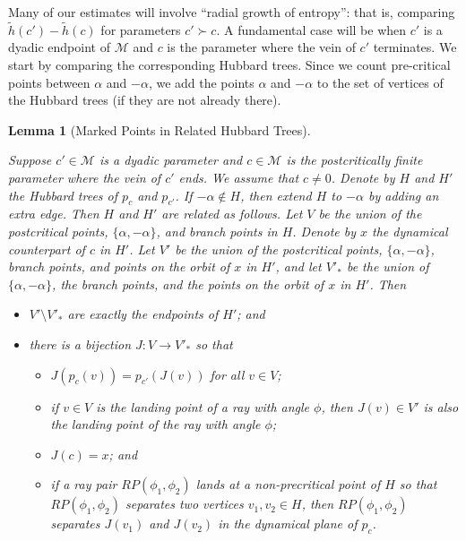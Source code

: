 \documentclass[12pt]{amsart}
\newcommand{\M}{\mathscr M}
\newcommand{\sm}{\setminus}
\newcommand{\0}{\texttt{0}}
\newcommand{\1}{\texttt{1}}
\newtheorem{lemma}[theorem]{Lemma}
\theoremstyle{definition}
\numberwithin{equation}{section}
\newcommand{\lineclear}{\rule{0pt}{2pt}\newline}
\begin{document}
Many of our estimates will involve ``radial growth of entropy'': that is, comparing $\tilde h(c')-\tilde h(c)$ for parameters $c'\succ c$. 
A fundamental case will be when $c'$ is a dyadic endpoint of $\M$ and $c$ is the parameter where the vein of $c'$ terminates. We start by comparing the corresponding Hubbard trees. 
Since we count pre-critical points between $\alpha$ and $-\alpha$, we add the points $\alpha$ and $-\alpha$ to the set of vertices of the Hubbard trees 
(if they are not already there).






\begin{lemma}[Marked Points in Related Hubbard Trees]
\label{Lem:MarkedPointsSubset_new} \lineclear
Suppose $c'\in\M$ is a dyadic parameter and $c\in\M$ is the postcritically finite parameter where the vein of $c'$ ends. We assume that $c\not= 0$. Denote by $H$ and $H'$ the Hubbard trees of $p_c$ and $p_{c'}$. If $-\alpha\not\in  H$, then extend $H$ to $-\alpha$ by adding an extra edge. Then $H$ and $H'$ are related as follows. Let $V$ be the union of the postcritical points, $\{\alpha, -\alpha \}$, and branch points in $H$. Denote by $x$ the dynamical counterpart of $c$ in $H'$. Let $V'$ be the union of the postcritical points, $\{\alpha,-\alpha\}$, branch points, and points on the orbit of $x$ in $H'$, and let $V'_*$ be the union of $\{\alpha, -\alpha\}$, the branch points, and the points on the orbit of $x$ in $H'$. Then 
\begin{itemize}
\item[(A)] $V'\sm V'_*$ are exactly the endpoints of $H'$; and
\item[(B)] there is a bijection $J\colon V\to V'_*$ so that 
\begin{itemize}
\item[(1)] $J(p_c(v))=p_{c'}(J(v))$ for all $v\in V$;
\item[(2)] if $v\in V$ is the landing point of a ray with angle $\phi$, then $J(v)\in V'$ is also the landing point of the ray with angle $\phi$; \item[(3)]  $J(c)=x$; and 
\item[(4)] if a ray pair $RP(\phi_1,\phi_2)$ lands at a non-precritical point of $H$ so that $RP(\phi_1,\phi_2)$ separates two vertices $v_1,v_2\in H$, then $RP(\phi_1,\phi_2)$ separates $J(v_1)$ and $J(v_2)$ in the dynamical plane of $p_{c}$.
\end{itemize}
\end{itemize}
\end{lemma}
\end{document}
